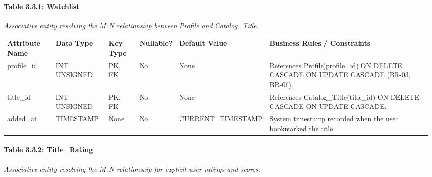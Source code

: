 \paragraph{Table 3.3.1: Watchlist}\label{table-3.3.1-watchlist}

\emph{Associative entity resolving the} \(M:N\) \emph{relationship between Profile and Catalog\_\allowbreak{}Title.}

{\def\LTcaptype{none} %
\begin{longtable}[]{@{}
  >{\raggedright\arraybackslash}p{}
  >{\raggedright\arraybackslash}p{}
  >{\raggedright\arraybackslash}p{}
  >{\raggedright\arraybackslash}p{}
  >{\raggedright\arraybackslash}p{}
  >{\raggedright\arraybackslash}p{}@{}}
\arrayrulecolor{black}\toprule\noalign{}
\endhead
\bottomrule\noalign{}
\endlastfoot
\textbf{Attribute Name} & \textbf{Data Type} & \textbf{Key Type} & \textbf{Nullable?} & \textbf{Default Value} & \textbf{Business Rules / Constraints} \\ \arrayrulecolor{black}\midrule
profile\_\allowbreak{}id & INT UNSIGNED & PK, FK & No & None & References Profile(profile\_\allowbreak{}id) ON DELETE CASCADE ON UPDATE CASCADE (BR-03, BR-06). \\ \arrayrulecolor{black!20}\midrule
title\_\allowbreak{}id & INT UNSIGNED & PK, FK & No & None & References Catalog\_\allowbreak{}Title(title\_\allowbreak{}id) ON DELETE CASCADE ON UPDATE CASCADE. \\ \arrayrulecolor{black!20}\midrule
added\_\allowbreak{}at & TIMESTAMP & None & No & CURRENT\_\allowbreak{}TIMESTAMP & System timestamp recorded when the user bookmarked the title. \\
\end{longtable}
}

\paragraph{Table 3.3.2: Title\_\allowbreak{}Rating}\label{table-3.3.2-title_rating}

\emph{Associative entity resolving the} \(M:N\) \emph{relationship for explicit user ratings and scores.}

